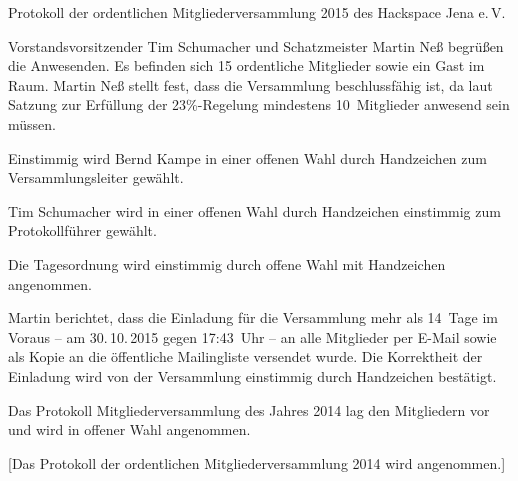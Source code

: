 \documentclass[ngerman]{scrartcl}
\begin{document}
\begin{Protokoll}{Protokoll der ordentlichen Mitgliederversammlung 2015 des Hackspace Jena e.\,V.}


\protokollKopf{}


Vorstandsvorsitzender Tim Schumacher und Schatzmeister Martin Neß
begrüßen die Anwesenden. Es befinden sich 15 ordentliche Mitglieder
sowie ein Gast im Raum. Martin Neß stellt fest, dass die Versammlung
beschlussfähig ist, da laut Satzung zur Erfüllung der 23\%-Regelung
mindestens 10~Mitglieder anwesend sein müssen.



  Einstimmig wird Bernd Kampe in einer offenen Wahl durch
  Handzeichen zum Versammlungsleiter gewählt.

  Tim Schumacher wird in einer offenen Wahl durch Handzeichen
  einstimmig zum Protokollführer gewählt.


Die Tagesordnung wird einstimmig durch offene Wahl mit Handzeichen
angenommen.


Martin berichtet, dass die Einladung für die Versammlung mehr als
14~Tage im Voraus -- am 30.\,10.\,2015 gegen 17:43~Uhr -- an alle
Mitglieder per E-Mail sowie als Kopie an die öffentliche Mailingliste
versendet wurde. Die Korrektheit der Einladung wird von der
Versammlung einstimmig durch Handzeichen bestätigt.


Das Protokoll Mitgliederversammlung des Jahres 2014 lag den
Mitgliedern vor und wird in offener Wahl angenommen.

\begin{Abstimmung}
  [Das Protokoll der ordentlichen Mitgliederversammlung 2014 wird angenommen.]
\end{Abstimmung}



\end{Protokoll}
\end{document}
